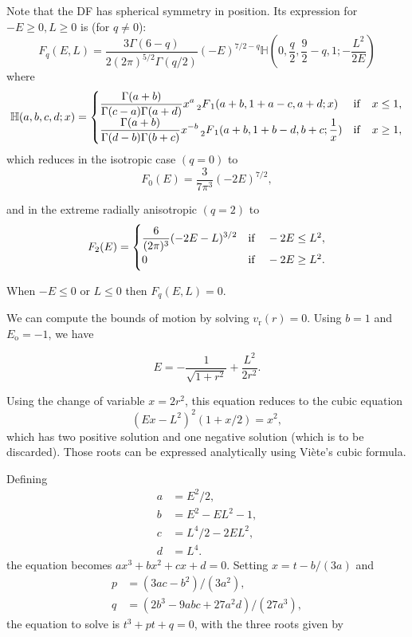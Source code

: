 \documentclass[11pt]{article}
\newcommand{\rr}{\mathrm{r}}
\newcommand{\ro}{\mathrm{o}}
\newcommand{\Eo}{E_{\ro}}
\newcommand{\vr}{v_{\rr}}
\newcommand{\Fq}{F_{q}}
\newcommand{\mH}{\mathbb{H}}
\newcommand{\HG}{\prescript{}{2}F_{1}}
\begin{document}
Note that the DF has spherical symmetry in position. Its expression for $-E \geq 0, L \geq 0$
is (for $q \neq0$):
\begin{equation}
  \Fq(E,L)=\frac{3\Gamma(6-q)}{2(2\pi)^{5/2}\Gamma(q/2)}(-E)^{7/2-q}\mH(0,\frac{q}{2},\frac{9}{2}-q,1;-\frac{L^{2}}{2E})
  \label{eq:def_Fq}
\end{equation}
where
\begin{equation}
\mH(a,b,c,d;x)=\begin{cases}
\displaystyle{\frac{\Gamma(a+b)}{\Gamma(c-a)\Gamma(a+d)}x^{a} \HG(a+b,1+a-c,a+d;x)} & {\rm{if}} \quad x\leq1 ,\\
\displaystyle{\frac{\Gamma(a+b)}{\Gamma(d-b)\Gamma(b+c)}x^{-b} \HG(a+b,1+b-d,b+c;\frac{1}{x})} &{\rm{if}} \quad x\geq1 ,
\end{cases}
\label{eq:def_H}
\end{equation}
which reduces in the isotropic case $(q=0)$ to
\begin{equation}
  F_{0}(E)=\frac{3}{7\pi^{3}}(-2E)^{7/2} ,
  \label{eq:F_q=0}
\end{equation}

and in the extreme radially anisotropic $(q=2)$ to
\begin{equation}
  F_{2}(E)=\begin{cases}
\displaystyle{ \frac{6}{(2\pi)^{3}}(-2E-L)^{3/2}} & {\rm{if}} \quad -2 E\leq L^{2} ,\\
0 &{\rm{if}} \quad - 2 E\geq L^{2} .
\end{cases}
  \label{eq:F_q=2}
\end{equation}

When $-E \leq 0$ or $L \leq 0$ then $\Fq(E,L) = 0$.

We can compute the bounds of motion by solving $\vr(r)=0$. Using $b=1$ and $\Eo=-1$, we have

$$E=-\frac{1}{\sqrt{1+r^{2}}} + \frac{L^{2}}{2r^{2}} .$$

Using the change of variable $x=2r^{2}$, this equation reduces to the cubic equation
$$(Ex-L^{2})^{2}(1+x/2) = x^{2},$$
which has two positive solution and one negative solution (which is to be discarded). Those roots can be expressed analytically using Viète's cubic formula.

Defining
\begin{align*}
  a &= E^{2}/2, \\
  b &= E^{2}-EL^{2}-1 ,\\
  c &= L^{4}/2-2EL^{2} ,\\
  d &= L^{4} .
\end{align*}
the equation becomes $a x^{3}+b x^{2}+c x+d = 0$. Setting $x=t-b/(3a)$ and
\begin{align*}
  p &= (3ac -b^{2})/(3a^{2}), \\
  q &= (2b^{3}-9abc+27a^{2}d)/(27a^{3}) ,
  \end{align*}
the equation to solve is $t^{3}+pt+q=0$, with the three roots given by
\end{document}
